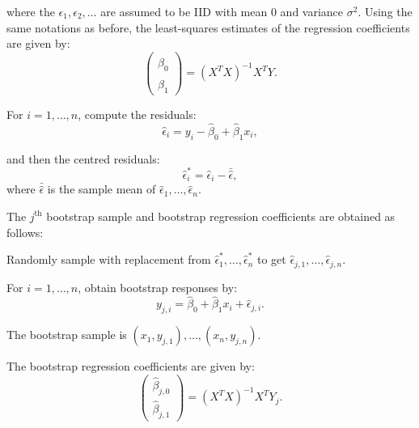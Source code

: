 where the $\epsilon_1,\epsilon_2,\ldots$ are assumed to be IID with mean 0 and variance $\sigma^2$. Using the same notations as before, the least-squares estimates of the regression coefficients are given by: 
$$\left(\begin{array}{c}\hat{\beta}_0\\\hat{\beta}_1\end{array}\right)=(X^TX)^{-1}X^TY.$$

For $i = 1,\ldots,n$, compute the residuals:
$$\hat{\epsilon}_i=y_i-\hat{\beta}_0+\hat{\beta}_1x_i,$$

and then the centred residuals:
$$\hat{\epsilon}^*_i=\hat{\epsilon}_i-\bar{\hat{\epsilon}},$$
where $\bar{\hat{\epsilon}}$ is the sample mean of $\hat{\epsilon}_1,\ldots,\hat{\epsilon}_n$.

The $j^{\textrm{th}}$ bootstrap sample and bootstrap regression coefficients are obtained as follows:
\begin{asparaenum}[(a)]
\item Randomly sample with replacement from $\hat{\epsilon}_1^*,\ldots,\hat{\epsilon}_n^*$ to get $\hat{\epsilon}_{j,1},\ldots,\hat{\epsilon}_{j,n}$.

\item	For $i = 1,\ldots,n$, obtain bootstrap responses by:
$$y_{j,i}=\hat{\beta}_0+\hat{\beta}_1x_i+\hat{\epsilon}_{j,i}.$$

The bootstrap sample is $(x_1,y_{j,1}),\ldots,(x_n,y_{j,n})$.

\item	The bootstrap regression coefficients are given by:
$$\left(\begin{array}{c}\hat{\beta}_{j,0}\\\hat{\beta}_{j,1}\end{array}\right)=(X^TX)^{-1}X^TY_j.$$
\end{asparaenum}

